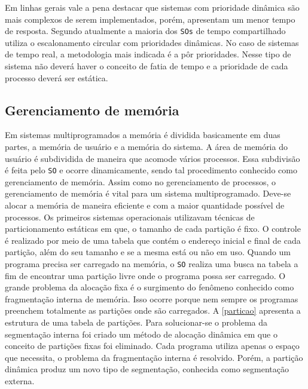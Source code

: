 Em linhas gerais vale a pena destacar que sistemas com prioridade dinâmica são mais complexos de serem implementados, porém, apresentam um menor tempo de resposta. Segundo \cite{machadomaia} atualmente a maioria dos \texttt{SOs} de tempo compartilhado utiliza o escalonamento circular com prioridades dinâmicas. No caso de sistemas de tempo real, a metodologia mais indicada é a pôr prioridades. Nesse tipo de sistema não deverá haver o conceito de fatia de tempo e a prioridade de cada processo deverá ser estática. 

\subsection{Gerenciamento de memória}

Em sistemas multiprogramados a memória é dividida basicamente em duas partes, a memória de usuário e a memória do sistema. A área de memória do usuário é subdividida de maneira que acomode vários processos. Essa subdivisão é feita pelo \texttt{SO} e ocorre dinamicamente, sendo tal procedimento conhecido como gerenciamento de memória. Assim como no gerenciamento de processos, o gerenciamento de memória é vital para um sistema multiprogramado. Deve-se alocar a memória de maneira eficiente e com a maior quantidade possível de processos.  Os primeiros sistemas operacionais utilizavam técnicas de particionamento estáticas em que, o tamanho de cada partição é fixo. O controle é realizado por meio de uma tabela que contém o endereço inicial e final de cada partição, além do seu tamanho e se a mesma está ou não em uso. Quando um programa precisa ser carregado na memória, o \texttt{SO} realiza uma busca na tabela a fim de encontrar uma partição livre onde o programa possa ser carregado. O grande problema da alocação fixa é o surgimento do fenômeno conhecido como fragmentação interna de memória. Isso ocorre porque nem sempre os programas preenchem totalmente as partições onde são carregados. A \autoref{particao} apresenta a estrutura de uma tabela de partições. Para solucionar-se o problema da segmentação interna foi criado um método de alocação dinâmica em que o conceito de partições fixas foi eliminado. Cada programa utiliza apenas o espaço que necessita, o problema da fragmentação interna é resolvido. Porém, a partição dinâmica produz um novo tipo de segmentação, conhecida como segmentação externa.

